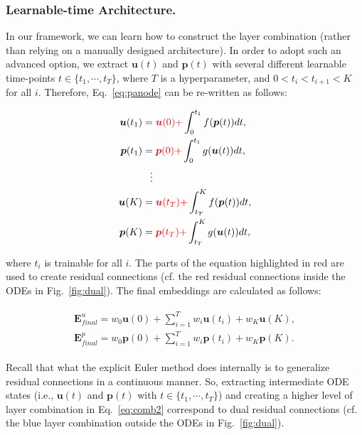 \documentclass[sigconf]{acmart}
\begin{document}
\subsubsection{Learnable-time Architecture.} In our framework, we can learn how to construct the layer combination (rather than relying on a manually designed architecture). In order to adopt such an advanced option, we extract $\bm{u}(t)$ and $\bm{p}(t)$ with several different learnable time-points $t \in \{t_1, \cdots, t_T\}$, where $T$ is a hyperparameter, and $0 < t_i < t_{i+1} < K$ for all $i$. Therefore, Eq.~\eqref{eq:panode} can be re-written as follows:
\begin{linenomath*}\begin{align}\begin{split}\label{eq:panode2}
    \bm{u}(t_1) =&\; {\color{red}\bm{u}(0) +} \int_{0}^{t_1}f(\bm{p}(t))dt,\\
    \bm{p}(t_1) =&\; {\color{red}\bm{p}(0) +} \int_{0}^{t_1}g(\bm{u}(t))dt,\\
\vdots\\
    \bm{u}(K) =&\; {\color{red}\bm{u}(t_T) +} \int_{t_T}^{K}f(\bm{p}(t))dt,\\
    \bm{p}(K) =&\; {\color{red}\bm{p}(t_T) +} \int_{t_T}^{K}g(\bm{u}(t))dt,
\end{split}\end{align}\end{linenomath*}where $t_i$ is trainable for all $i$. The parts of the equation highlighted in red are used to create residual connections (cf. the red residual connections inside the ODEs in Fig.~\ref{fig:dual}). The final embeddings are calculated as follows:
\begin{linenomath*}\begin{align}\begin{split}\label{eq:comb2}
    \bm{E}^u_{final} = w_0\bm{u}(0) + \sum_{i=1}^{T}w_i\bm{u}(t_i) + w_K\bm{u}(K),\\
    \bm{E}^p_{final} = w_0\bm{p}(0) + \sum_{i=1}^{T}w_i\bm{p}(t_i) + w_K\bm{p}(K).
\end{split}\end{align}\end{linenomath*}

Recall that what the explicit Euler method does internally is to generalize residual connections in a continuous manner. So, extracting intermediate ODE states (i.e., $\bm{u}(t)$ and $\bm{p}(t)$ with $t \in \{t_1, \cdots, t_T\}$) and creating a higher level of layer combination in Eq.~\eqref{eq:comb2} correspond to dual residual connections (cf. the blue layer combination outside the ODEs in Fig.~\ref{fig:dual}).
\end{document}
